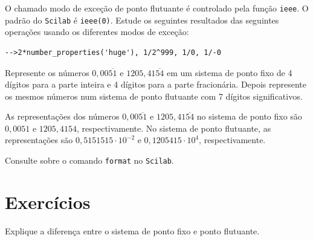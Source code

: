 \documentclass[main.tex]{subfiles}
\begin{document}

\ifisscilab
\begin{obs}
  O chamado modo de exceção de ponto flutuante é controlado pela função \verb+ieee+. O padrão do \verb+Scilab+ é \verb+ieee(0)+. Estude os seguintes resultados das seguintes operações usando os diferentes modos de exceção:
\begin{verbatim}
-->2*number_properties('huge'), 1/2^999, 1/0, 1/-0
\end{verbatim}
\end{obs}
\fi


\begin{ex}Represente os números $0,00\overline{51}$ e $1205,41\overline{54}$ em um sistema de ponto fixo de 4 dígitos para a parte inteira e 4 dígitos para a parte fracionária. Depois represente os mesmos números num sistema de ponto flutuante com 7 dígitos significativos.
\end{ex}
\begin{sol} As representações dos números $0,00\overline{51}$ e $1205,41\overline{54}$ no sistema de ponto fixo são $0,0051$ e $1205,4154$, respectivamente. No sistema de ponto flutuante, as representações são $0,5151515\cdot 10^{-2}$ e $0,1205415 \cdot 10^{4}$, respectivamente.
\end{sol}

\ifisscilab
\begin{obs}
  Consulte sobre o comando \verb'format' no \verb+Scilab+.
\end{obs}
\fi

\section*{Exercícios}

\begin{Exercise} Explique a diferença entre o sistema de ponto fixo e ponto flutuante.
\end{Exercise}
\end{document}
